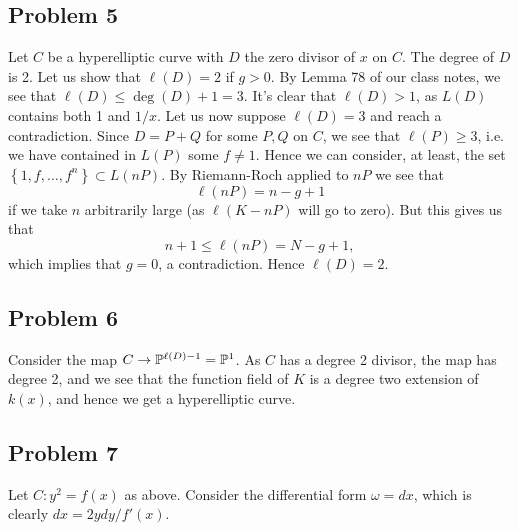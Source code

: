 \documentclass{../../mathnotes}
\begin{document}
\subsection*{Problem 5}

Let $C$ be a hyperelliptic curve with $D$ the zero divisor of $x$ on $C$. The degree of $D$ is 2. Let us show that
$\ell(D)=2$ if $g>0$. By Lemma 78 of our class notes, we see that $\ell(D)\leq \deg(D)+1=3$. It's clear that $\ell(D)>1$,
as $L(D)$ contains both 1 and $1/x$. Let us now suppose $\ell(D)=3$ and reach a contradiction. Since $D=P+Q$ for some $P,Q$ on $C$,
we see that $\ell(P)\geq 3$, i.e. we have contained in $L(P)$ some $f\neq 1$. Hence we can consider, at least, the set
$\left\{ 1,f,\ldots,f^n \right\}\subset L(nP)$. By Riemann-Roch applied to $nP$ we see that
\[\ell(nP)=n-g+1\]
if we take $n$ arbitrarily large (as $\ell(K-nP)$ will go to zero). But this gives us that
\[n+1\leq\ell(nP)=N-g+1,\]
which implies that $g=0$, a contradiction. Hence $\ell(D)=2$.


\subsection*{Problem 6}

Consider the map $C\to\mathbb{P}^{\ell(D)-1}=\mathbb{P}^1$. As $C$ has a degree 2 divisor, the map has degree 2, and we see that the function field of $K$
is a degree two extension of $k(x)$, and hence we get a hyperelliptic curve.


\subsection*{Problem 7}

Let $C:y^2=f(x)$ as above. Consider the differential form $\omega=dx$, which is clearly $dx=2ydy/f'(x)$.
\end{document}
